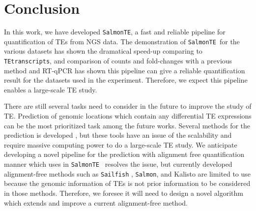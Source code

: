 \documentclass{ws-procs11x85}
\newcommand{\TEtranscripts}{\texttt{TEtranscripts}}
\newcommand{\SalmonTE}{\texttt{SalmonTE}}
\begin{document}
\section{Conclusion}


In this work, we have developed \SalmonTE, a fast and reliable pipeline for quantification of TEs from 
NGS data.
The demonstration of \SalmonTE~for the various datasets has shown the dramatical speed-up comparing to \TEtranscripts, 
and comparison of counts and fold-changes with a previous method and RT-qPCR has shown this pipeline can give 
a reliable quantification result for the datasets used in the experiment. 
Therefore, we expect this pipeline enables a large-scale TE study.

There are still several tasks need to consider in the future to improve the study of TE. Prediction of genomic locations which 
contain any differential TE expressions can be the most prioritized task among the future works. Several methods for the prediction is
developed \cite{de2017identifying,criscione2014transcriptional}, but these tools have an issue of the scalability and require
massive computing power to do a large-scale TE study. We
anticipate developing a novel pipeline for the prediction with alignment free quantification manner which uses in \SalmonTE~
resolves the issue, but currently developed alignment-free methods such as \verb|Sailfish| \cite{patro2014sailfish}, \verb|Salmon|\cite{patro2017salmon}, 
and Kalisto \cite{bray2015near} are limited to use
because the genomic information of TEs is not prior information to be considered in those methods.
Therefore, we foresee it will need to design a novel algorithm which extends and improve a current alignment-free method.



\end{document}
